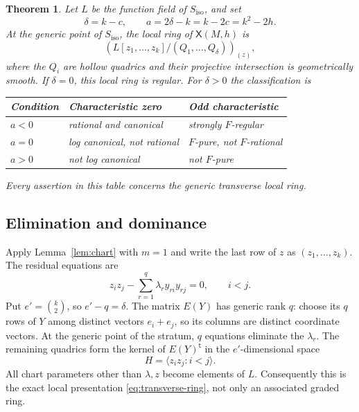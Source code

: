 \documentclass[11pt]{article}
\newtheorem{theorem}{Theorem}[section]
\theoremstyle{definition}
\theoremstyle{remark}
\numberwithin{equation}{section}
\newcommand{\XX}{\mathsf X}
\begin{document}
\begin{theorem}\label{thm:transverse}
Let $L$ be the function field of $S_{\mathrm{iso}}$, and set
\[
 \delta=k-c,\qquad a=2\delta-k=k-2c=k^2-2h.
\]
At the generic point of $S_{\mathrm{iso}}$, the local ring of
$\XX(M,h)$ is
\begin{equation}\label{eq:transverse-ring}
 \left(L[z_1,\ldots,z_k]/(Q_1,\ldots,Q_\delta)\right)_{(z)},
\end{equation}
where the $Q_i$ are hollow quadrics and their projective intersection
is geometrically smooth. If $\delta=0$, this local ring is regular.
For $\delta>0$ the classification is
\begin{center}
\begin{tabular}{@{}lll@{}}
\toprule
Condition & Characteristic zero & Odd characteristic\\
\midrule
$a<0$ & rational and canonical & strongly $F$-regular\\
$a=0$ & log canonical, not rational & $F$-pure, not $F$-rational\\
$a>0$ & not log canonical & not $F$-pure\\
\bottomrule
\end{tabular}
\end{center}
Every assertion in this table concerns the generic transverse local ring.
\end{theorem}

\subsection{Elimination and dominance}

Apply Lemma~\ref{lem:chart} with $m=1$ and write the last row of $z$
as $(z_1,\ldots,z_k)$. The residual equations are
\begin{equation}\label{eq:odd-residual}
 z_i z_j-\sum_{r=1}^q\lambda_r y_{ri}y_{rj}=0,
 \qquad i<j.
\end{equation}
Put $e'=\binom k2$, so $e'-q=\delta$. The matrix $E(Y)$ has
generic rank $q$: choose its $q$ rows of $Y$ among distinct vectors
$e_i+e_j$, so its columns are distinct coordinate vectors. At the
generic point of the stratum, $q$ equations eliminate the $\lambda_r$.
The remaining quadrics form the kernel of $E(Y)^{\mathsf t}$ in the
$e'$-dimensional space
\[
 H=\langle z_i z_j:i<j\rangle.
\]
All chart parameters other than $\lambda,z$ become elements of $L$.
Consequently this is the exact local presentation
\eqref{eq:transverse-ring}, not only an associated graded ring.
\end{document}

